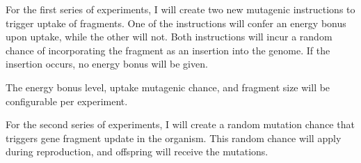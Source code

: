 For the first series of experiments, I will create two new mutagenic instructions to trigger uptake of fragments. One of the instructions will confer an energy bonus upon uptake, while the other will not.  Both instructions will incur a random chance of incorporating the fragment as an insertion into the genome.  If the insertion occurs, no energy bonus will be given. 

The energy bonus level, uptake mutagenic chance, and fragment size will be configurable per experiment. 

For the second series of experiments, I will create a random mutation chance that triggers gene fragment update in the organism. This random chance will apply during reproduction, and offspring will receive the mutations.

